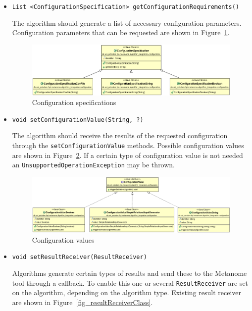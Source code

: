 \documentclass[10pt,a4paper]{article}
\begin{document}
\begin{itemize}
\item \texttt{List <ConfigurationSpecification> getConfigurationRequirements()}

The algorithm should generate a list of necessary configuration parameters. Configuration parameters that can be requested are shown in Figure~\ref{fig_configurationSpecificationClass}.

\begin{figure}[h]
\includegraphics[width=\textwidth]{configurationSpecification_class}
\caption{Configuration specifications}
\label{fig_configurationSpecificationClass}
\end{figure}

\item \texttt{void setConfigurationValue(String, ?)}

The algorithm should receive the results of the requested configuration through the \texttt{setConfigurationValue} methods. Possible configuration values are shown in Figure~\ref{fig_configurationValueClass}. If a certain type of configuration value is not needed an \texttt{UnsupportedOperationException} may be thrown.

\begin{figure}[h]
\includegraphics[width=\textwidth]{configurationValue_class}
\caption{Configuration values}
\label{fig_configurationValueClass}
\end{figure}

\item \texttt{void setResultReceiver(ResultReceiver)}

Algorithms generate certain types of results and send these to the Metanome tool through a callback. To enable this one or several \texttt{ResultReceiver} are set on the algorithm, depending on the algorithm type. Existing result receiver are shown in Figure~\ref{fig_resultReceiverClass}.


\end{itemize}
\end{document}
